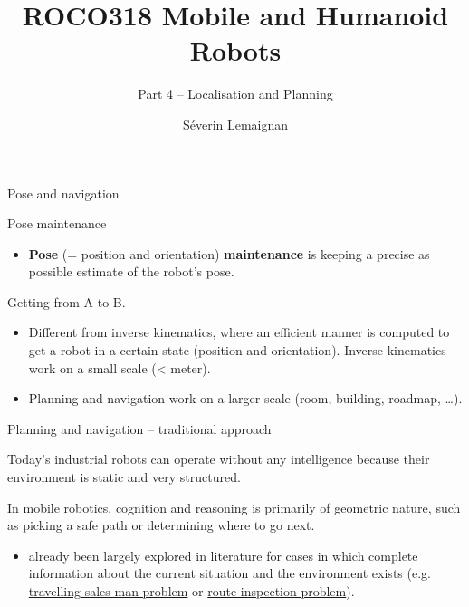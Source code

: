 \documentclass[compress]{beamer}
\title{ROCO318 \newline Mobile and Humanoid Robots}
\subtitle{Part 4 -- Localisation and Planning}
\date{}
\author{Séverin Lemaignan}
\institute{Centre for Neural Systems and Robotics\\{\bf Plymouth University}}
\begin{document}

\maketitle

\begin{frame}{Pose and navigation}

Pose maintenance

\begin{itemize}
\item \textbf{Pose} (= position and orientation) \textbf{maintenance} is
  keeping a precise as possible estimate of the robot's pose.
\end{itemize}

Getting from A to B.

\begin{itemize}
\item Different from inverse kinematics, where an efficient manner is
  computed to get a robot in a certain state (position and orientation).
  Inverse kinematics work on a small scale (\textless{} meter).
\item Planning and navigation work on a larger scale (room, building,
  roadmap, \ldots{}).
\end{itemize}

\end{frame}

\begin{frame}{Planning and navigation -- traditional approach}

Today's industrial robots can operate without any intelligence because
their environment is static and very structured.

In mobile robotics, cognition and reasoning is primarily of geometric
nature, such as picking a safe path or determining where to go next.

\begin{itemize}
\item already been largely explored in literature for cases in which
  complete information about the current situation and the environment
  exists (e.g.
  \href{http://en.wikipedia.org/wiki/Travelling_salesman_problem}{travelling
  sales man problem} or
  \href{http://en.wikipedia.org/wiki/Route_inspection_problem}{route
  inspection problem}).
\end{itemize}

\end{frame}
\end{document}
